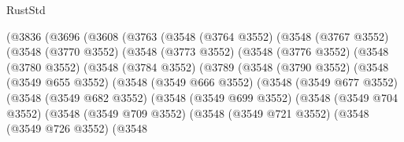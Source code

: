 \begin{lexlean}{RustStd}
\begin{coremodule}
                              (@3836
                                (@3696
                                  (@3608
                                    (@3763
                                      (@3548
                                        (@3764 @3552)
                                        (@3548
                                          (@3767 @3552)
                                          (@3548
                                            (@3770 @3552)
                                            (@3548
                                              (@3773 @3552)
                                              (@3548
                                                (@3776 @3552)
                                                (@3548
                                                  (@3780 @3552)
                                                  (@3548
                                                    (@3784 @3552)
                                                    (@3789
                                                      (@3548
                                                        (@3790 @3552)
                                                        (@3548
                                                          (@3549 @655 @3552)
                                                          (@3548
                                                            (@3549 @666 @3552)
                                                            (@3548
                                                              (@3549 @677 @3552)
                                                              (@3548
                                                                (@3549 @682 @3552)
                                                                (@3548
                                                                  (@3549 @699 @3552)
                                                                  (@3548
                                                                    (@3549 @704 @3552)
                                                                    (@3548
                                                                      (@3549 @709 @3552)
                                                                      (@3548
                                                                        (@3549 @721 @3552)
                                                                        (@3548
                                                                          (@3549 @726 @3552)
                                                                          (@3548

\end{coremodule}
\end{lexlean}
